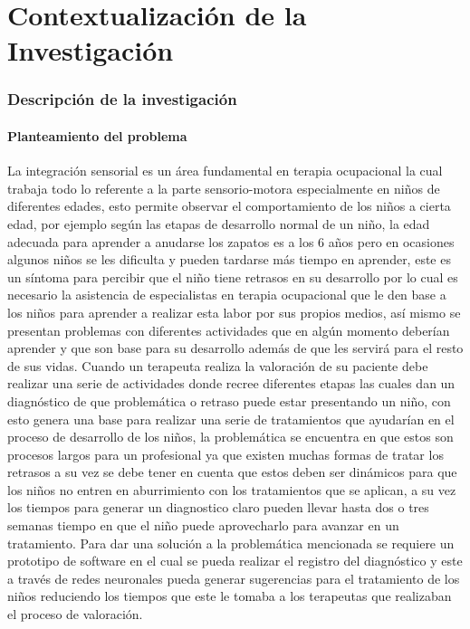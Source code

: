 \part{Contextualización de la Investigación}
    \section{Descripción de la investigación}
    \subsection{Planteamiento del problema}
    La integración sensorial es un área fundamental en terapia ocupacional la cual trabaja todo lo referente a la parte sensorio-motora especialmente en niños de diferentes edades, esto permite observar el comportamiento de los niños a cierta edad, por ejemplo según las etapas de desarrollo normal de un niño, la edad adecuada para aprender a anudarse los zapatos es a los 6 años pero en ocasiones algunos niños se les dificulta y pueden tardarse más tiempo en aprender, este es un síntoma para percibir que el niño tiene retrasos en su desarrollo por lo cual es necesario la asistencia de especialistas en terapia ocupacional que le den base a los niños para aprender a realizar esta labor por sus propios medios, así mismo se presentan problemas con diferentes actividades que en algún momento deberían aprender y que son base para su desarrollo además de que les servirá para el resto de sus vidas.
    Cuando un terapeuta realiza la valoración de su paciente debe realizar una serie de actividades donde recree diferentes etapas las cuales dan un diagnóstico de que problemática o retraso puede estar presentando un niño, con esto genera una base para realizar una serie de tratamientos que ayudarían en el proceso de desarrollo de los niños, la problemática se encuentra en que estos son procesos largos para un profesional ya que existen muchas formas de tratar los retrasos a su vez se debe tener en cuenta que estos deben ser dinámicos para que los niños no entren en aburrimiento con los tratamientos que se aplican, a su vez los tiempos para generar un diagnostico claro pueden llevar hasta dos o tres semanas tiempo en que el niño puede aprovecharlo para avanzar en un tratamiento.
    Para dar una solución a la problemática mencionada se requiere un prototipo de software en el cual se pueda realizar el registro del diagnóstico y este a través de redes neuronales pueda generar sugerencias para el tratamiento de los niños reduciendo los tiempos que este le tomaba a los terapeutas que realizaban el proceso de valoración.
